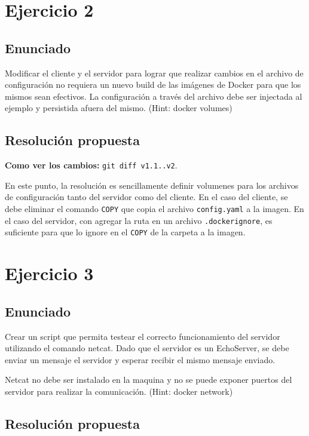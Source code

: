 \documentclass{article}
\begin{document}
\section{Ejercicio 2}

\subsection{Enunciado}
Modificar el cliente y el servidor para lograr que realizar cambios en el archivo de configuración no requiera un nuevo build de las imágenes de Docker para que los mismos sean efectivos. La configuración a través del archivo debe ser injectada al ejemplo y persistida afuera del mismo. (Hint: docker volumes)

\subsection{Resolución propuesta}

\textbf{Como ver los cambios: }\texttt{git diff v1.1..v2}.

En este punto, la resolución es sencillamente definir volumenes\cite{DockerVolumes} para los archivos de configuración tanto del servidor como del cliente. En el caso del cliente, se debe eliminar el comando \texttt{COPY} que copia el archivo \texttt{config.yaml} a la imagen. En el caso del servidor, con agregar la ruta en un archivo \texttt{.dockerignore}\cite{dockerignore}, es suficiente para que lo ignore en el \texttt{COPY} de la carpeta a la imagen.

\section{Ejercicio 3}

\subsection{Enunciado}
Crear un script que permita testear el correcto funcionamiento del servidor utilizando el comando netcat. Dado que el servidor es un EchoServer, se debe enviar un mensaje el servidor y esperar recibir el mismo mensaje enviado.

Netcat no debe ser instalado en la maquina y no se puede exponer puertos del servidor para realizar la comunicación. (Hint: docker network)

\subsection{Resolución propuesta}
\end{document}
